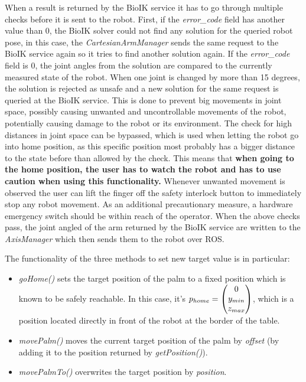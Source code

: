 When a result is returned by the BioIK service it has to go through multiple checks before it is sent to the robot. First, if the \textit{error\_code} field has another value than $0$, the BioIK solver could not find any solution for the queried robot pose, in this case, the \textit{CartesianArmManager} sends the same request to the BioIK service again so it tries to find another solution again. If the \textit{error\_code} field is $0$, the joint angles from the solution are compared to the currently measured state of the robot. When one joint is changed by more than 15 degrees, the solution is rejected as unsafe and a new solution for the same request is queried at the BioIK service. This is done to prevent big movements in joint space, possibly causing unwanted and uncontrollable movements of the robot, potentially causing damage to the robot or its environment. The check for high distances in joint space can be bypassed, which is used when letting the robot go into home position, as this specific position most probably has a bigger distance to the state before than allowed by the check. This means that \textbf{when going to the home position, the user has to watch the robot and has to use caution when using this functionality.} Whenever unwanted movement is observed the user can lift the finger off the safety interlock button to immediately stop any robot movement. As an additional precautionary measure, a hardware emergency switch should be within reach of the operator. When the above checks pass, the joint angled of the arm returned by the BioIK service are written to the \textit{AxisManager} which then sends them to the robot over ROS.

The functionality of the three methods to set new target value is in particular:
\begin{itemize}
	\item \textit{goHome()} sets the target position of the palm to a fixed position which is known to be safely reachable. In this case, it's $p_{home} = \left( \begin{matrix} 0 \\ y_{min} \\ z_{max} \end{matrix} \right)$, which is a position located directly in front of the robot at the border of the table.
	\item \textit{movePalm()} moves the current target position of the palm by \textit{offset} (by adding it to the position returned by \textit{getPosition()}).
	\item \textit{movePalmTo()} overwrites the target position by \textit{position}.
\end{itemize}



